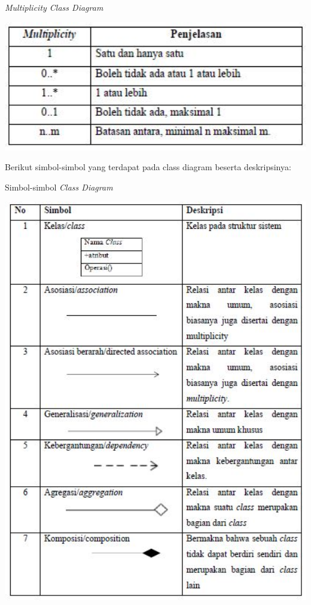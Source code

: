 \begin{table}[H]
	\centering
	\caption{\emph{Multiplicity Class Diagram}}
	\includegraphics[width=1.0\textwidth]{gambar/multiplicity}
	\label{tabel_karaktermax2}
\end{table}
Berikut simbol-simbol yang terdapat pada class diagram beserta deskripsinya:
\begin{table}[H]
	\centering
	\caption{Simbol-simbol \emph{Class Diagram}}
	\includegraphics[width=1.0\textwidth]{gambar/simbolclass}
	\label{tabel_karaktermax2}
\end{table}

